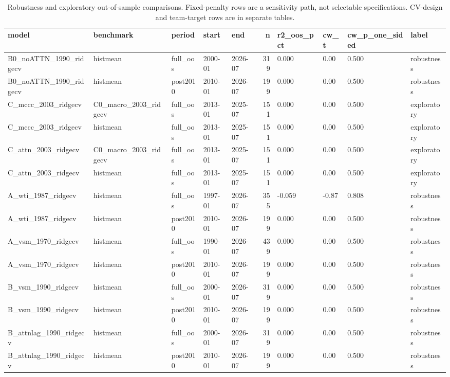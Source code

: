 \begin{table}
\caption{Robustness and exploratory out-of-sample comparisons. Fixed-penalty rows are a sensitivity path, not selectable specifications. CV-design and team-target rows are in separate tables.}
\label{tab:m6_oos_robustness}
\begin{tabular}{lllllrllll}
\toprule
model & benchmark & period & start & end & n & r2\_oos\_pct & cw\_t & cw\_p\_one\_sided & label \\
\midrule
B0\_noATTN\_1990\_ridgecv & histmean & full\_oos & 2000-01 & 2026-07 & 319 & 0.000 & 0.00 & 0.500 & robustness \\
B0\_noATTN\_1990\_ridgecv & histmean & post2010 & 2010-01 & 2026-07 & 199 & 0.000 & 0.00 & 0.500 & robustness \\
C\_mccc\_2003\_ridgecv & C0\_macro\_2003\_ridgecv & full\_oos & 2013-01 & 2025-07 & 151 & 0.000 & 0.00 & 0.500 & exploratory \\
C\_mccc\_2003\_ridgecv & histmean & full\_oos & 2013-01 & 2025-07 & 151 & 0.000 & 0.00 & 0.500 & exploratory \\
C\_attn\_2003\_ridgecv & C0\_macro\_2003\_ridgecv & full\_oos & 2013-01 & 2025-07 & 151 & 0.000 & 0.00 & 0.500 & exploratory \\
C\_attn\_2003\_ridgecv & histmean & full\_oos & 2013-01 & 2025-07 & 151 & 0.000 & 0.00 & 0.500 & exploratory \\
A\_wti\_1987\_ridgecv & histmean & full\_oos & 1997-01 & 2026-07 & 355 & -0.059 & -0.87 & 0.808 & robustness \\
A\_wti\_1987\_ridgecv & histmean & post2010 & 2010-01 & 2026-07 & 199 & 0.000 & 0.00 & 0.500 & robustness \\
A\_vsm\_1970\_ridgecv & histmean & full\_oos & 1990-01 & 2026-07 & 439 & 0.000 & 0.00 & 0.500 & robustness \\
A\_vsm\_1970\_ridgecv & histmean & post2010 & 2010-01 & 2026-07 & 199 & 0.000 & 0.00 & 0.500 & robustness \\
B\_vsm\_1990\_ridgecv & histmean & full\_oos & 2000-01 & 2026-07 & 319 & 0.000 & 0.00 & 0.500 & robustness \\
B\_vsm\_1990\_ridgecv & histmean & post2010 & 2010-01 & 2026-07 & 199 & 0.000 & 0.00 & 0.500 & robustness \\
B\_attnlag\_1990\_ridgecv & histmean & full\_oos & 2000-01 & 2026-07 & 319 & 0.000 & 0.00 & 0.500 & robustness \\
B\_attnlag\_1990\_ridgecv & histmean & post2010 & 2010-01 & 2026-07 & 199 & 0.000 & 0.00 & 0.500 & robustness \\

\end{tabular}
\end{table}
